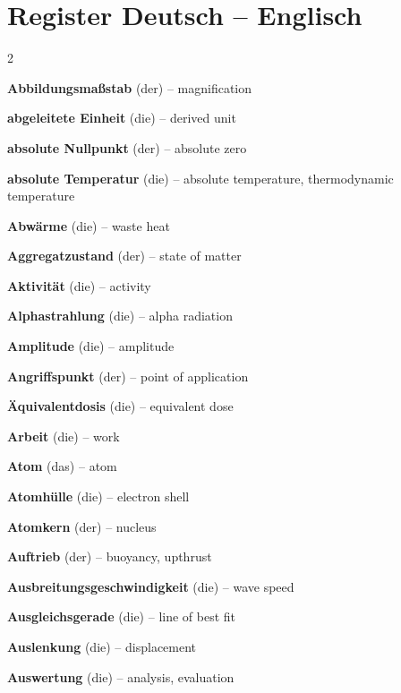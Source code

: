 \section{Register Deutsch -- Englisch}
\begin{multicols}{2}\small\raggedright

\par\nopagebreak
\textbf{Abbildungsmaßstab} (der) -- magnification\dotfill\hyperref[e:252]{\pageref*{e:252}}\par
\textbf{abgeleitete Einheit} (die) -- derived unit\dotfill\hyperref[e:5]{\pageref*{e:5}}\par
\textbf{absolute Nullpunkt} (der) -- absolute zero\dotfill\hyperref[e:115]{\pageref*{e:115}}\par
\textbf{absolute Temperatur} (die) -- absolute temperature, thermodynamic temperature\dotfill\hyperref[e:114]{\pageref*{e:114}}\par
\textbf{Abwärme} (die) -- waste heat\dotfill\hyperref[e:108]{\pageref*{e:108}}\par
\textbf{Aggregatzustand} (der) -- state of matter\dotfill\hyperref[e:125]{\pageref*{e:125}}\par
\textbf{Aktivität} (die) -- activity\dotfill\hyperref[e:283]{\pageref*{e:283}}\par
\textbf{Alphastrahlung} (die) -- alpha radiation\dotfill\hyperref[e:275]{\pageref*{e:275}}\par
\textbf{Amplitude} (die) -- amplitude\dotfill\hyperref[e:195]{\pageref*{e:195}}\par
\textbf{Angriffspunkt} (der) -- point of application\dotfill\hyperref[e:60]{\pageref*{e:60}}\par
\textbf{Äquivalentdosis} (die) -- equivalent dose\dotfill\hyperref[e:284]{\pageref*{e:284}}\par
\textbf{Arbeit} (die) -- work\dotfill\hyperref[e:96]{\pageref*{e:96}}\par
\textbf{Atom} (das) -- atom\dotfill\hyperref[e:259]{\pageref*{e:259}}\par
\textbf{Atomhülle} (die) -- electron shell\dotfill\hyperref[e:261]{\pageref*{e:261}}\par
\textbf{Atomkern} (der) -- nucleus\dotfill\hyperref[e:260]{\pageref*{e:260}}\par
\textbf{Auftrieb} (der) -- buoyancy, upthrust\dotfill\hyperref[e:92]{\pageref*{e:92}}\par
\textbf{Ausbreitungsgeschwindigkeit} (die) -- wave speed\dotfill\hyperref[e:203]{\pageref*{e:203}}\par
\textbf{Ausgleichsgerade} (die) -- line of best fit\dotfill\hyperref[e:24]{\pageref*{e:24}}\par
\textbf{Auslenkung} (die) -- displacement\dotfill\hyperref[e:194]{\pageref*{e:194}}\par
\textbf{Auswertung} (die) -- analysis, evaluation\dotfill\hyperref[e:19]{\pageref*{e:19}}\par


\end{multicols}
